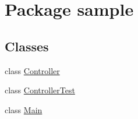 \hypertarget{namespacesample}{}\section{Package sample}
\label{namespacesample}
\subsection*{Classes}
\begin{DoxyCompactItemize}
\item 
class \hyperlink{classsample_1_1_controller}{Controller}
\item 
class \hyperlink{classsample_1_1_controller_test}{Controller\+Test}
\item 
class \hyperlink{classsample_1_1_main}{Main}
\end{DoxyCompactItemize}
